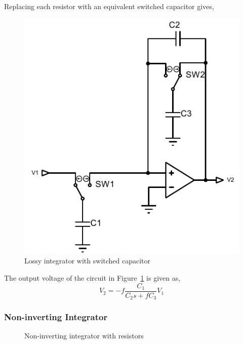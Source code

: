 Replacing each resistor with an equivalent switched capacitor gives,
\begin{figure}[H]
    \centering
    \includegraphics[scale=0.7]{../Figures/lossy_integrator}
    \caption{Lossy integrator with switched capacitor}
    \label{fig:int-lossy-cap}
\end{figure}
The output voltage of the circuit in Figure~\ref{fig:int-lossy-cap} is given as,
\begin{equation}
    V_2=-f\frac{C_1}{C_2s+fC_3}V_1
\end{equation}

\subsubsection*{Non-inverting Integrator}
\begin{figure}[H]
    \centering
    \fignoninvintegrator
    \caption{Non-inverting integrator with resistors}
    \label{fig:int-non}
\end{figure}

